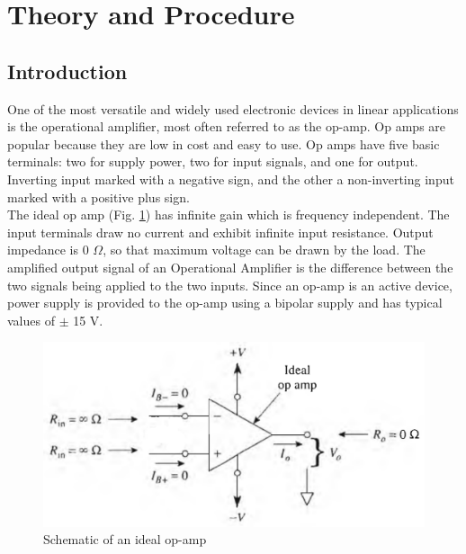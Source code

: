 \section{Theory and Procedure}



\subsection*{Introduction}

One of the most versatile and widely used electronic devices in linear applications is the operational amplifier, most often referred to as the op-amp. Op amps are popular because they are low in cost and easy to use. Op amps have five basic terminals: two for supply power, two for input signals, and one for output. Inverting input marked with a negative sign, and the other a non-inverting input marked with a positive plus sign.\\

The ideal op amp (Fig. \ref{fig:0}) has infinite gain which is frequency independent. The input terminals draw no current and exhibit infinite input resistance. Output impedance is 0 $\Omega$, so that maximum voltage can be drawn by the load.
The amplified output signal of an Operational Amplifier is the difference between the two signals being applied to the two inputs. Since an op-amp is an active device,  power supply is provided to the op-amp using a bipolar supply and has typical values of $\pm$ 15 V.\\

\begin{figure}[H]
    \centering
    \includegraphics[width=0.90\columnwidth]{images/ideal.png}
    \caption{Schematic of an ideal op-amp\\}
    \label{fig:0}
\end{figure}

